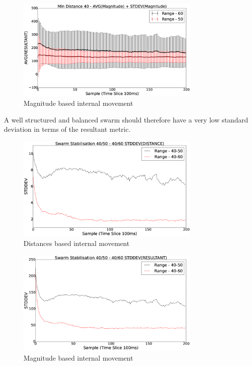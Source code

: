 \documentclass[10pt,journal,letterpaper,twoside]{IEEEtran}
\newcommand{\stability}{internal movement}
\begin{document}
\begin{figure}[H]
\begin{center}
\includegraphics[width=9cm]{figures/StabilityMagnitudeSwarm40-5060}
\end{center}
\caption{Magnitude based \stability{}\label{methods:StabilityMagnitudeSwarm40-5060}}
\end{figure}

A well structured and balanced swarm should therefore have a very low
standard deviation in terms of the resultant metric.

\begin{figure}[H]
\begin{center}
\includegraphics[width=9cm]{figures/StabilityDistanceSwarm}
\end{center}
\caption{Distances based \stability{}\label{methods:StabilityDistanceSwarm}}
\end{figure}

\begin{figure}[H]
\begin{center}
\includegraphics[width=9cm]{figures/StabilityMagnitudeSwarm}
\end{center}
\caption{Magnitude based \stability{}\label{methods:StabilityMagnitudeSwarm}}
\end{figure}
\end{document}
